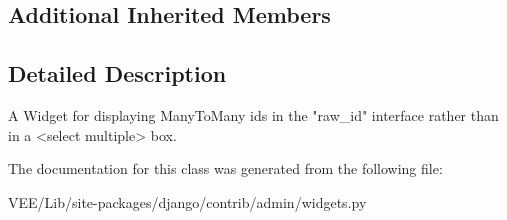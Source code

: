 \subsection*{Additional Inherited Members}


\subsection{Detailed Description}
\begin{DoxyVerb}A Widget for displaying ManyToMany ids in the "raw_id" interface rather than
in a <select multiple> box.
\end{DoxyVerb}
 

The documentation for this class was generated from the following file\+:\begin{DoxyCompactItemize}
\item 
V\+E\+E/\+Lib/site-\/packages/django/contrib/admin/widgets.\+py\end{DoxyCompactItemize}
